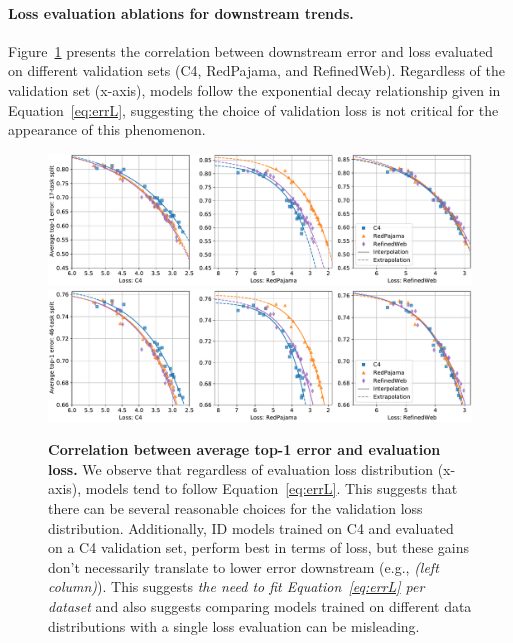 \begin{appendix}
\paragraph{Loss evaluation ablations for downstream trends.}
Figure~\ref{fig:downstream_corr_ablation} presents the correlation between downstream error and loss evaluated on different validation sets (C4, RedPajama, and RefinedWeb). Regardless of the validation set (x-axis), models follow the exponential decay relationship given in Equation~\eqref{eq:errL}, suggesting the choice of validation loss is not critical for the appearance of this phenomenon.

\begin{figure}[tp]
    \centering
    \includegraphics[width=0.98\linewidth]{figs/downstream_corr_ablation.pdf}
    \includegraphics[width=0.98\linewidth]{figs/downstream_corr_ablation_all.pdf}
    \caption{\textbf{Correlation between average top-1 error and evaluation loss.}
    We observe that regardless of evaluation loss distribution (x-axis), models tend to follow Equation~\eqref{eq:errL}.
    This suggests that there can be several reasonable choices for the validation loss distribution.
    Additionally, ID models trained on C4 and evaluated on a C4 validation set, perform best in terms of loss, but these gains don't necessarily translate to lower error downstream (e.g., \emph{(left column)}).
    This suggests \emph{the need to fit Equation~\eqref{eq:errL} per dataset} and also suggests comparing models trained on different data distributions with a single loss evaluation can be misleading.
    }
    \label{fig:downstream_corr_ablation}
\end{figure}


\end{appendix}

